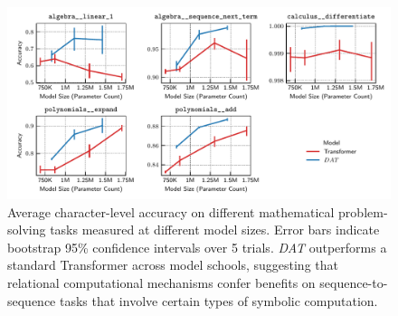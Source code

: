 

\begin{figure}[t]
    \includegraphics[width=\textwidth]{figs/experiments/math/math_accuracy_scaling.pdf}
    \caption{Average character-level accuracy on different mathematical problem-solving tasks measured at different model sizes. Error bars indicate bootstrap 95\% confidence intervals over 5 trials. \textit{DAT} outperforms a standard Transformer across model schools, suggesting that relational computational mechanisms confer benefits on sequence-to-sequence tasks that involve certain types of symbolic computation.}\label{fig:math_scaling}
\end{figure}

%     


